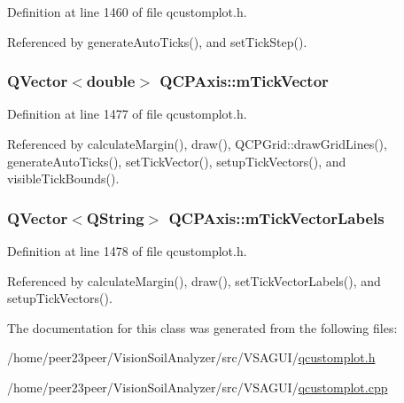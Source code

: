 Definition at line 1460 of file qcustomplot.\+h.



Referenced by generate\+Auto\+Ticks(), and set\+Tick\+Step().

\hypertarget{class_q_c_p_axis_aae0f9b9973b85be601200f00f5825087}{}
\subsubsection[{m\+Tick\+Vector}]{\setlength{\rightskip}{0pt plus 5cm}Q\+Vector$<$double$>$ Q\+C\+P\+Axis\+::m\+Tick\+Vector\hspace{0.3cm}{\ttfamily [protected]}}\label{class_q_c_p_axis_aae0f9b9973b85be601200f00f5825087}


Definition at line 1477 of file qcustomplot.\+h.



Referenced by calculate\+Margin(), draw(), Q\+C\+P\+Grid\+::draw\+Grid\+Lines(), generate\+Auto\+Ticks(), set\+Tick\+Vector(), setup\+Tick\+Vectors(), and visible\+Tick\+Bounds().

\hypertarget{class_q_c_p_axis_aeee4bd0fca3f587eafe33843d1cb4f82}{}
\subsubsection[{m\+Tick\+Vector\+Labels}]{\setlength{\rightskip}{0pt plus 5cm}Q\+Vector$<$Q\+String$>$ Q\+C\+P\+Axis\+::m\+Tick\+Vector\+Labels\hspace{0.3cm}{\ttfamily [protected]}}\label{class_q_c_p_axis_aeee4bd0fca3f587eafe33843d1cb4f82}


Definition at line 1478 of file qcustomplot.\+h.



Referenced by calculate\+Margin(), draw(), set\+Tick\+Vector\+Labels(), and setup\+Tick\+Vectors().



The documentation for this class was generated from the following files\+:\begin{DoxyCompactItemize}
\item 
/home/peer23peer/\+Vision\+Soil\+Analyzer/src/\+V\+S\+A\+G\+U\+I/\hyperlink{qcustomplot_8h}{qcustomplot.\+h}\item 
/home/peer23peer/\+Vision\+Soil\+Analyzer/src/\+V\+S\+A\+G\+U\+I/\hyperlink{qcustomplot_8cpp}{qcustomplot.\+cpp}\end{DoxyCompactItemize}
